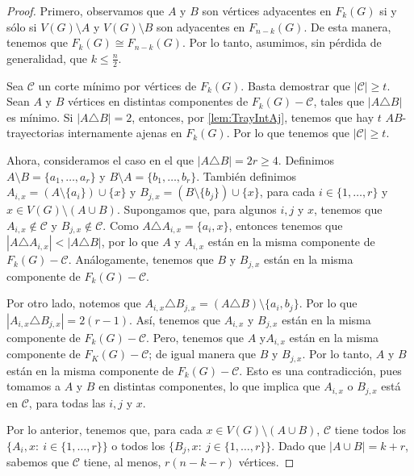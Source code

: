 \begin{proof}
Primero, observamos que $A$ y $B$ son v\'ertices adyacentes en $F_k(G)$ si y
s\'olo si $V(G) \setminus A$ y $V(G)\setminus B$ son adyacentes en $F_{n-k}(G)$.
De esta manera, tenemos que $F_k(G) \cong F_{n-k}(G)$. Por lo tanto, asumimos,
sin p\'erdida de generalidad, que $k \leq \frac{n}{2}$.

Sea $\mathcal{C}$ un corte m\'inimo por v\'ertices de $F_k(G)$. Basta demostrar
que $|\mathcal{C}| \geq t$. Sean $A$ y $B$ v\'ertices en distintas componentes
de $F_k(G)- \mathcal{C}$, tales que $|A \triangle B|$ es m\'inimo. Si $|A
\triangle B| = 2$, entonces, por \cref{lem:TrayIntAj}, tenemos que hay $t$
$AB$-trayectorias internamente ajenas en $F_k(G)$. Por lo que tenemos que
$|\mathcal{C}| \geq t$.

Ahora, consideramos el caso en el que $|A \triangle B| = 2r \geq 4$. Definimos
$A \setminus B =\{a_1, \dots, a_r\}$ y $B \setminus A =\{b_1, \dots, b_r\}$.
Tambi\'en definimos $A_{i,x} = (A\setminus \{a_i\}) \cup \{x\}$ y 
\linebreak
$B_{j,x} = (B\setminus
\{b_j\}) \cup \{x\}$, para cada $i \in \{1, \dots, r\}$ y $x \in V(G)\setminus
(A\cup B)$. Supongamos que, para algunos $i, j$ y $x$, tenemos que $A_{i,x}
\notin \mathcal{C}$ y $B_{j,x} \notin \mathcal{C}$. Como $A \triangle A_{i,x} =
\{a_i, x\}$, entonces tenemos que $|A \triangle A_{i,x}|< |A \triangle B|$, por
lo que $A$ y $A_{i,x}$ est\'an en la misma componente de $F_k(G)- \mathcal{C}$.
An\'alogamente, tenemos que  $B$ y $B_{j,x}$ est\'an en la misma componente de
$F_k(G)-\mathcal{C}$.

Por otro lado, notemos que $A_{i,x} \triangle B_{j,x} = (A \triangle B)
\setminus \{a_i, b_j\}$. Por lo que $|A_{i,x} \triangle B_{j,x}| = 2(r-1)$.
As\'i, tenemos que $A_{i,x}$ y $B_{j,x}$ est\'an en la misma componente de
$F_k(G)- \mathcal{C}$. Pero, tenemos que $A$ y$A_{i,x}$ est\'an en la misma
componente de $F_K(G) - \mathcal{C}$; de igual manera que $B$ y $B_{j,x}$. Por
lo tanto, $A$ y $B$ est\'an en la misma componente de $F_k(G)- \mathcal{C}$.
Esto es una contradicci\'on, pues tomamos a $A$ y $B$ en distintas componentes,
lo que implica que $A_{i,x}$ o $B_{j,x}$ est\'a en $\mathcal{C}$, para todas las
$i,j$ y $x$.

Por lo anterior, tenemos que, para cada $x \in V(G)\setminus (A \cup B)$,
$\mathcal{C}$ tiene todos los $\{A_i,x \colon\  i \in \{1, \dots, r\}\}$ o todos
los $\{B_j,x \colon\ j \in \{1, \dots, r\}\}$. Dado que $|A\cup B|=k +r$,
sabemos que $\mathcal{C}$ tiene, al menos, $r(n-k-r)$ v\'ertices.


\end{proof}
